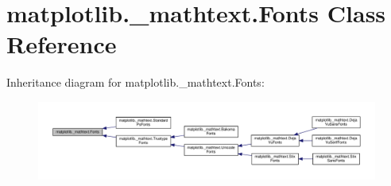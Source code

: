 \hypertarget{classmatplotlib_1_1__mathtext_1_1Fonts}{}\section{matplotlib.\+\_\+mathtext.\+Fonts Class Reference}
\label{classmatplotlib_1_1__mathtext_1_1Fonts}


Inheritance diagram for matplotlib.\+\_\+mathtext.\+Fonts\+:
\nopagebreak
\begin{figure}[H]
\begin{center}
\leavevmode
\includegraphics[width=350pt]{classmatplotlib_1_1__mathtext_1_1Fonts__inherit__graph}
\end{center}
\end{figure}
